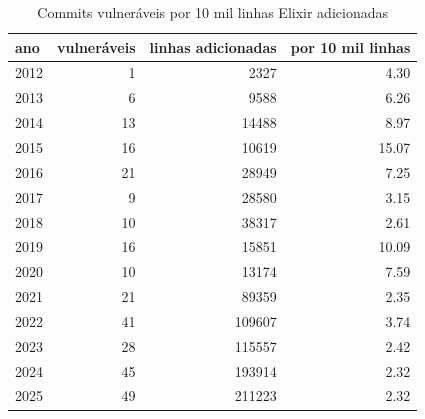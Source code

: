 \begin{table}[htbp]
\centering
\caption{Commits vulneráveis por 10 mil linhas Elixir adicionadas}
\label{tab:volume_vulneraveis}
\begin{tabular}{lrrr}
\toprule
ano & vulneráveis & linhas adicionadas & por 10 mil linhas \\
\midrule
2012 & 1 & 2327 & 4.30 \\
2013 & 6 & 9588 & 6.26 \\
2014 & 13 & 14488 & 8.97 \\
2015 & 16 & 10619 & 15.07 \\
2016 & 21 & 28949 & 7.25 \\
2017 & 9 & 28580 & 3.15 \\
2018 & 10 & 38317 & 2.61 \\
2019 & 16 & 15851 & 10.09 \\
2020 & 10 & 13174 & 7.59 \\
2021 & 21 & 89359 & 2.35 \\
2022 & 41 & 109607 & 3.74 \\
2023 & 28 & 115557 & 2.42 \\
2024 & 45 & 193914 & 2.32 \\
2025 & 49 & 211223 & 2.32 \\
\bottomrule
\end{tabular}
\end{table}
